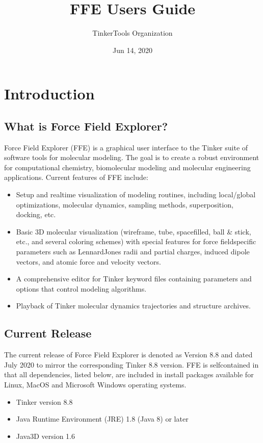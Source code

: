 \documentclass[letterpaper,11pt,english]{sphinxmanual}
\title{FFE User\textquotesingle{}s Guide}
\date{Jun 14, 2020}
\author{TinkerTools Organization}
\begin{document}
\pagestyle{empty}
\sphinxmaketitle
\pagestyle{plain}
\sphinxtableofcontents
\pagestyle{normal}
\label{\detokenize{index::doc}}



\chapter{Introduction}
\label{\detokenize{text/introduction:introduction}}\label{\detokenize{text/introduction::doc}}

\section{What is Force Field Explorer?}
\label{\detokenize{text/introduction:what-is-force-field-explorer}}
Force Field Explorer (FFE) is a graphical user interface to the Tinker suite of software tools for molecular modeling. The goal is to create a robust environment for computational chemistry, biomolecular modeling and molecular engineering applications. Current features of FFE include:
\begin{itemize}
\item {} 
Setup and real\sphinxhyphen{}time visualization of modeling routines, including local/global optimizations, molecular dynamics, sampling methods, superposition, docking, etc.

\item {} 
Basic 3D molecular visualization (wireframe, tube, spacefilled, ball \& stick, etc., and several coloring schemes) with special features for force field\sphinxhyphen{}specific parameters such as Lennard\sphinxhyphen{}Jones radii and partial charges, induced dipole vectors, and atomic force and velocity vectors.

\item {} 
A comprehensive editor for Tinker keyword files containing parameters and options that control modeling algorithms.

\item {} 
Playback of Tinker molecular dynamics trajectories and structure archives.

\end{itemize}


\section{Current Release}
\label{\detokenize{text/introduction:current-release}}
The current release of Force Field Explorer is denoted as Version 8.8 and dated July 2020 to mirror the corresponding Tinker 8.8 version. FFE is self\sphinxhyphen{}contained in that all dependencies, listed below, are included in install packages available for Linux, MacOS and Microsoft Windows operating systems.
\begin{itemize}
\item {} 
Tinker version 8.8

\item {} 
Java Runtime Environment (JRE) 1.8 (Java 8) or later

\item {} 
Java3D version 1.6

\end{itemize}
\end{document}
